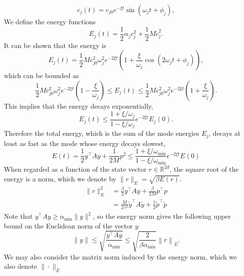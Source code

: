 \documentclass[prx,onecolumn,floatfix,longbibliography,notitlepage, nofootinbib]{revtex4-1}
\renewcommand{\geq}{\geqslant}
\renewcommand{\leq}{\leqslant}
\begin{document}
\begin{appendix}
\begin{equation}
    c_j(t) = c_{j0}e^{-\xi t}\sin(\omega_j t + \phi_j),
\end{equation}
We define the energy functions
\begin{equation}
    E_j(t) = \frac{1}{2} \alpha_j c_j^2 + \frac{1}{2} M \dot{c}_j^2.
\end{equation}
It can be shown that the energy is
\begin{equation}
    E_j(t) =  \frac{1}{2} M c_{j0}^2\omega_j^2e^{-2 \xi t} \left(1 + \frac{\xi  }{\omega_j}\cos(2 \omega_j t + \phi_j) \right),
\end{equation}
which can be bounded as
\begin{equation}
   \frac{1}{2} M c_{j0}^2\omega_j^2e^{-2 \xi t} \left(1 - \frac{\xi  }{\omega_j} \right) \leq  E_j(t) \leq  \frac{1}{2} M c_{j0}^2\omega_j^2e^{-2 \xi t} \left(1 + \frac{\xi  }{\omega_j} \right).
\end{equation}
This implies that the energy decays exponentially,
\begin{equation}
    E_j(t) \leq \frac{1+\xi/\omega_j}{1-\xi/\omega_j}e^{-2 \xi t} E_j(0).
\end{equation}
Therefore the total energy, which is the sum of the mode energies $E_j$, decays at least as fast as the mode whose energy decays slowest,
\begin{equation}
    E(t) = \frac{1}{2} y^\intercal A y +\frac{1}{2M} p^2 \leq  \frac{1+\xi/\omega_\text{min}}{1-\xi/\omega_\text{min}}e^{-2 \xi t} E(0)
\end{equation}
When regarded as a function of the state vector $r\in \mathbb{R}^{2d}$, the square root of the energy is a norm, which we denote by $\|r\|_E = \sqrt{\beta E(r)}$.
\begin{align}
    \|r\|_E^2 &= \frac{\beta}{2}y^\intercal A y + \frac{\beta}{2M}p^\intercal p\\
    &= \frac{M}{2\gamma^2}\tilde{y}^\intercal A \tilde{y} + \frac{1}{2 } \tilde{p}^\intercal \tilde{p}
\end{align}
Note that $y^\intercal A y \geq \alpha_\text{min} \|y\|^2$, so the energy norm gives the following upper bound on the Euclidean norm of the vector $y$
\begin{equation}
    \|y\| \leq  \sqrt{\frac{y^\intercal A y}{\alpha_\text{min}}} \leq \sqrt{\frac{2}{\beta \alpha_\text{min}}} \left \|r \right\|_E.
\end{equation}
We may also consider the matrix norm induced by the energy norm, which we also denote $\| \cdot\|_E$

\end{appendix}
\end{document}
